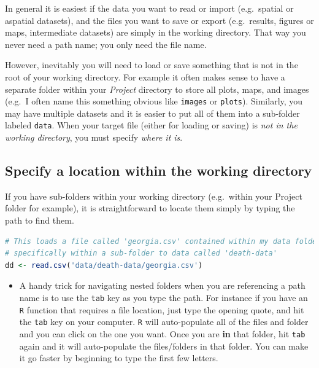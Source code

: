 \documentclass[
]{book}
\newcommand{\passthrough}[1]{#1}
\newenvironment{rmdblock}[1]
  {%
  \begin{itemize}
  \renewcommand{\labelitemi}{
    \raisebox{-.7\height}[0pt][0pt]{
      {\setkeys{Gin}{width=3em,keepaspectratio}\texttt{[image: images/\#1]}}
    }
  }
  \item
  }
  {
  \end{itemize}
  }
\newenvironment{rmdtip}
  {\begin{rmdblock}{tip}}
  {\end{rmdblock}}
\begin{document}
In general it is easiest if the data you want to read or import (e.g.~spatial or aspatial datasets), and the files you want to save or export (e.g.~results, figures or maps, intermediate datasets) are simply in the working directory. That way you never need a path name; you only need the file name.

However, inevitably you will need to load or save something that is not in the root of your working directory. For example it often makes sense to have a separate folder within your \emph{Project} directory to store all plots, maps, and images (e.g.~I often name this something obvious like \passthrough{\lstinline!images!} or \passthrough{\lstinline!plots!}). Similarly, you may have multiple datasets and it is easier to put all of them into a sub-folder labeled \passthrough{\lstinline!data!}. When your target file (either for loading or saving) is \emph{not in the working directory}, you must specify \emph{where it is}.

\hypertarget{specify-a-location-within-the-working-directory}{%
\subsection*{Specify a location within the working directory}\label{specify-a-location-within-the-working-directory}}

If you have sub-folders within your working directory (e.g.~within your Project folder for example), it is straightforward to locate them simply by typing the path to find them.

\begin{lstlisting}[language=R]
# This loads a file called 'georgia.csv' contained within my data folder, and
# specifically within a sub-folder to data called 'death-data'
dd <- read.csv('data/death-data/georgia.csv')
\end{lstlisting}

\begin{rmdtip}
A handy trick for navigating nested folders when you are referencing a path name is to use the \passthrough{\lstinline!tab!} key as you type the path. For instance if you have an \passthrough{\lstinline!R!} function that requires a file location, just type the opening quote, and hit the \passthrough{\lstinline!tab!} key on your computer. \passthrough{\lstinline!R!} will auto-populate all of the files and folder and you can click on the one you want. Once you are \textbf{in} that folder, hit \passthrough{\lstinline!tab!} again and it will auto-populate the files/folders in that folder. You can make it go faster by beginning to type the first few letters.
\end{rmdtip}
\end{document}

